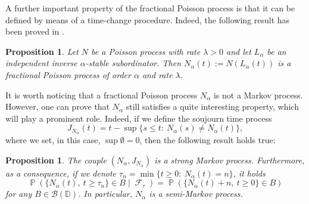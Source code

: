 \documentclass[]{amsart}
\numberwithin{equation}{section}
\newtheorem{prop}[thm]{Proposition}
\theoremstyle{remark}
\theoremstyle{definition}
\DeclareMathOperator{\cF}{\mathcal{F}}
\DeclareMathOperator{\bP}{\mathbb{P}}
\begin{document}
A further important property of the fractional Poisson process is that it can be defined by means of a time-change procedure. 
Indeed, the following result has been proved in \cite{meerschaert2011fractional}.
\begin{prop}
	Let $N$ be a Poisson process with rate $\lambda>0$ and let $L_\alpha$ be an independent inverse $\alpha$-stable subordinator. Then $N_\alpha(t):=N(L_\alpha(t))$ is a fractional Poisson process of order $\alpha$ and rate $\lambda$.
\end{prop}
It is worth noticing that a fractional Poisson process $N_\alpha$ is not a Markov process. However, one can prove that $N_\alpha$ still satisfies a quite interesting property, which will play a prominent role. Indeed, if we define the soujourn time process
\begin{equation*}
	J_{N_\alpha}(t)=t-\sup\{s \le t: \ N_\alpha(s)\not = N_\alpha(t)\},
\end{equation*}
where we set, in this case, $\sup \emptyset =0$, then the following result holds true:
\begin{prop}
	The couple $(N_\alpha,J_{N_\alpha})$ is a strong Markov process. Furthermore, as a consequence, if we denote $\tau_n=\min\{t \ge 0: \ N_\alpha(t)=n\}$, it holds
	\begin{equation*}
		\bP(\{N_\alpha(t), \ t \ge \tau_n \} \in B \mid \cF_\tau)=\bP(\{N_\alpha(t)+n, \ t \ge 0 \} \in B)
	\end{equation*}
	for any $B \in \mathcal{B}(\mathbb{D})$. In particular, $N_\alpha$ is a semi-Markov process.
\end{prop}
\end{document}
